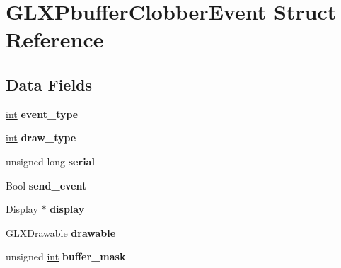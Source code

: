 \hypertarget{struct_g_l_x_pbuffer_clobber_event}{}\section{G\+L\+X\+Pbuffer\+Clobber\+Event Struct Reference}
\label{struct_g_l_x_pbuffer_clobber_event}
\subsection*{Data Fields}
\begin{DoxyCompactItemize}
\item 
\hyperlink{_s_d_l__thread_8h_a6a64f9be4433e4de6e2f2f548cf3c08e}{int} {\bfseries event\+\_\+type}\hypertarget{struct_g_l_x_pbuffer_clobber_event_afc1309cf76ca8d8c896773d580fa7249}{}\label{struct_g_l_x_pbuffer_clobber_event_afc1309cf76ca8d8c896773d580fa7249}

\item 
\hyperlink{_s_d_l__thread_8h_a6a64f9be4433e4de6e2f2f548cf3c08e}{int} {\bfseries draw\+\_\+type}\hypertarget{struct_g_l_x_pbuffer_clobber_event_a06d1e79aecda989a0c8028ffda94639a}{}\label{struct_g_l_x_pbuffer_clobber_event_a06d1e79aecda989a0c8028ffda94639a}

\item 
unsigned long {\bfseries serial}\hypertarget{struct_g_l_x_pbuffer_clobber_event_a1e3162f089d71a92c383b398715e0c92}{}\label{struct_g_l_x_pbuffer_clobber_event_a1e3162f089d71a92c383b398715e0c92}

\item 
Bool {\bfseries send\+\_\+event}\hypertarget{struct_g_l_x_pbuffer_clobber_event_ac4f71daa70e286c44f1dea3e50b10a44}{}\label{struct_g_l_x_pbuffer_clobber_event_ac4f71daa70e286c44f1dea3e50b10a44}

\item 
Display $\ast$ {\bfseries display}\hypertarget{struct_g_l_x_pbuffer_clobber_event_a854f9eb314f72feecf68ba03c6f0e5d5}{}\label{struct_g_l_x_pbuffer_clobber_event_a854f9eb314f72feecf68ba03c6f0e5d5}

\item 
G\+L\+X\+Drawable {\bfseries drawable}\hypertarget{struct_g_l_x_pbuffer_clobber_event_a62119946057e07c196ba3a0fa429606b}{}\label{struct_g_l_x_pbuffer_clobber_event_a62119946057e07c196ba3a0fa429606b}

\item 
unsigned \hyperlink{_s_d_l__thread_8h_a6a64f9be4433e4de6e2f2f548cf3c08e}{int} {\bfseries buffer\+\_\+mask}\hypertarget{struct_g_l_x_pbuffer_clobber_event_af8fdbb7e1f23b27874f9c3faa344d707}{}\label{struct_g_l_x_pbuffer_clobber_event_af8fdbb7e1f23b27874f9c3faa344d707}


\end{DoxyCompactItemize}
